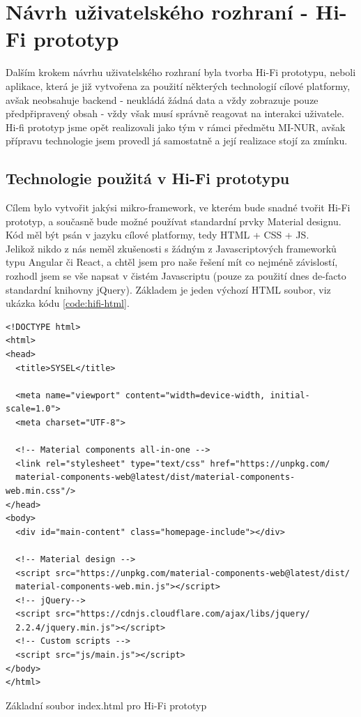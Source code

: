 \section{Návrh uživatelského rozhraní - Hi-Fi prototyp}

Dalším krokem návrhu uživatelského rozhraní byla tvorba Hi-Fi prototypu, neboli aplikace, která je již vytvořena za použití některých technologií cílové platformy, avšak neobsahuje backend - neukládá žádná data a vždy zobrazuje pouze předpřipravený obsah - vždy však musí správně reagovat na interakci uživatele.\\
Hi-fi prototyp jsme opět realizovali jako tým v rámci předmětu MI-NUR, avšak přípravu technologie jsem provedl já samostatně a její realizace stojí za zmínku.


\subsection{Technologie použitá v Hi-Fi prototypu}

Cílem bylo vytvořit jakýsi mikro-framework, ve kterém bude snadné tvořit Hi-Fi prototyp, a současně bude možné používat standardní prvky Material designu. Kód měl být psán v jazyku cílové platformy, tedy HTML + CSS + JS.\\
Jelikož nikdo z nás neměl zkušenosti s žádným z Javascriptových frameworků typu Angular či React, a chtěl jsem pro naše řešení mít co nejméně závislostí, rozhodl jsem se vše napsat v čistém Javascriptu (pouze za použití dnes de-facto standardní knihovny jQuery). Základem je jeden výchozí HTML soubor, viz ukázka kódu \ref{code:hifi-html}.

\begin{listing}[H]
\begin{verbatim}
<!DOCTYPE html>
<html>
<head>
  <title>SYSEL</title>

  <meta name="viewport" content="width=device-width, initial-scale=1.0">
  <meta charset="UTF-8">

  <!-- Material components all-in-one -->
  <link rel="stylesheet" type="text/css" href="https://unpkg.com/
  material-components-web@latest/dist/material-components-web.min.css"/>
</head>
<body>
  <div id="main-content" class="homepage-include"></div>

  <!-- Material design -->
  <script src="https://unpkg.com/material-components-web@latest/dist/
  material-components-web.min.js"></script>
  <!-- jQuery-->
  <script src="https://cdnjs.cloudflare.com/ajax/libs/jquery/
  2.2.4/jquery.min.js"></script>
  <!-- Custom scripts -->
  <script src="js/main.js"></script>
</body>
</html>
\end{verbatim}
\caption{Základní soubor index.html pro Hi-Fi prototyp} \label{code:hifi-html}
\end{listing}

